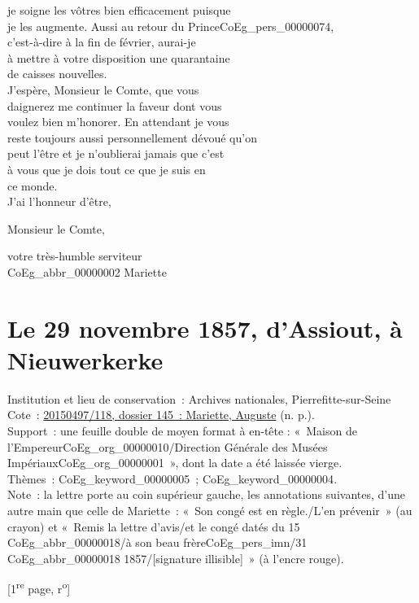 \documentclass{book}
\begin{document}
je soigne les vôtres bien efficacement puisque\\
je les augmente. Aussi au retour du Prince\gls{CoEg_pers_00000074},\\
c’est-à-dire à la fin de février, aurai-je\\
à mettre à votre disposition une quarantaine\\
de caisses nouvelles.\\
\indent J’espère, Monsieur le Comte, que vous\\
daignerez me continuer la faveur dont vous\\
voulez bien m’honorer. En attendant je vous\\
reste toujours aussi personnellement dévoué qu’on\\
peut l’être et je n’oublierai jamais que c’est\\
à vous que je dois tout ce que je suis en\\
ce monde.\\
\indent J’ai l’honneur d’être,
\begin{center}Monsieur le Comte,\end{center}
\begin{center}\hspace{5cm}votre très-humble serviteur\\
\hspace{5cm} \gls{CoEg_abbr_00000002} Mariette\end{center}
\hypertarget{CoEg_Mariette_1857-11-29}{}
\section*{Le 29 novembre 1857, d’Assiout, à Nieuwerkerke}  
{\footnotesize
\noindent Institution et lieu de conservation~: Archives nationales, Pierrefitte-sur-Seine\\
Cote~: \hyperlink{CoEg_Mariette_ms_001}{20150497/118, dossier 145~: Mariette, Auguste} (n. p.).\\
Support~: une feuille double de moyen format à en-tête : «~Maison de l'Empereur\gls{CoEg_org_00000010}/Direction Générale des Musées Impériaux\gls{CoEg_org_00000001}~», dont la date a été laissée vierge.\\
Thèmes~: \gls{CoEg_keyword_00000005}~; \gls{CoEg_keyword_00000004}.\\
Note~: la lettre porte au coin supérieur gauche, les annotations suivantes, d’une autre main que celle de Mariette~: «~Son congé est en règle./L’en prévenir~» (au crayon) et «~Remis la lettre d’avis/et le congé datés du 15 \gls{CoEg_abbr_00000018}/à son beau frère\gls{CoEg_pers_imn}/31 \gls{CoEg_abbr_00000018} 1857/{[signature illisible]}~» (à l'encre rouge).

\begin{center} [1\textsuperscript{re} page, r\textsuperscript{o}]\end{center}}
\end{document}
